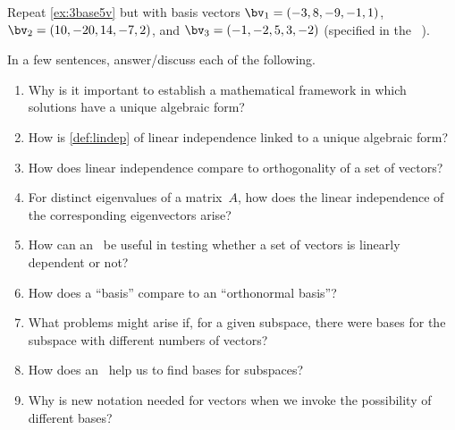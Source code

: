 \begin{exercise}  
Repeat \cref{ex:3base5v} but with basis vectors \(\bv_1=(-3,8,-9,-1,1)\), \(\bv_2=(10,-20,14,-7,2)\), and \(\bv_3=(-1,-2,5,3,-2)\) (specified in the ~\cE).
\setbox\ajrqrbox\hbox{}\marginajrbox%
\end{exercise}




\begin{exercise} 
In a few sentences, answer\slash discuss each of the following.
\begin{enumerate}
\item  Why is it important to establish a mathematical framework in which solutions have a unique algebraic form?

\item How is \cref{def:lindep} of linear independence linked to a unique algebraic form?

\item How does linear independence compare to orthogonality of a set of vectors?

\item For distinct eigenvalues of a matrix~\(A\), how does the linear independence of the corresponding eigenvectors arise?

\item How can an \svd\ be useful in testing whether a set of vectors is linearly dependent or not?

\item How does a ``basis'' compare to an ``orthonormal basis''?

\item What problems might arise if, for a given subspace, there were bases for the subspace with different numbers of vectors?

\item How does an \svd\ help us to find bases for subspaces?

\item Why is new notation needed for vectors when we invoke the possibility of different bases?

\end{enumerate}
\end{exercise}

\begin{comment}%
why, what caused X?
how did X occur?
what-if? what-if-not?
how does X compare with Y?
what is the evidence for X?
why is X important?
\end{comment}






